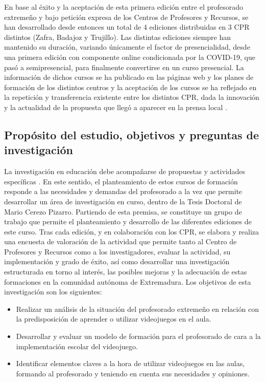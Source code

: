 \documentclass[spanish]{textolivre}
\begin{document}
En base al éxito y la aceptación de esta primera edición entre el profesorado extremeño y bajo petición expresa de los Centros de Profesores y Recursos, se han desarrollado desde entonces un total de 4 ediciones distribuidas en 3 CPR distintos (Zafra, Badajoz y Trujillo). Las distintas ediciones siempre han mantenido su duración, variando únicamente el factor de presencialidad, desde una primera edición con componente online condicionada por la COVID-19, que pasó a semipresencial, para finalmente convertirse en un curso presencial. La información de dichos cursos se ha publicado en las páginas web y los planes de formación de los distintos centros \cite{cprzafra2021videojuegos} y la aceptación de los cursos se ha reflejado en la repetición y transferencia existente entre los distintos CPR, dada la innovación y la actualidad de la propuesta que llegó a aparecer en la prensa local \cite{diariohoy2022curso}.


\subsection{Propósito del estudio, objetivos y preguntas de investigación}\label{sec-formato}
La investigación en educación debe acompañarse de propuestas y actividades específicas \cite{counsell2000usefulness,gonzalez2023diseno}. En este sentido, el planteamiento de estos cursos de formación responde a las necesidades y demandas del profesorado a la vez que permite desarrollar un área de investigación en curso, dentro de la Tesis Doctoral de Mario Cerezo Pizarro. Partiendo de esta premisa, se constituye un grupo de trabajo que permite el planteamiento y desarrollo de las diferentes ediciones de este curso. Tras cada edición, y en colaboración con los CPR, se elabora y realiza una encuesta de valoración de la actividad que permite tanto al Centro de Profesores y Recursos como a los investigadores, evaluar la actividad, su implementación y grado de éxito, así como desarrollar una investigación estructurada en torno al interés, las posibles mejoras y la adecuación de estas formaciones en la comunidad autónoma de Extremadura. Los objetivos de esta investigación son los siguientes:

\begin{itemize}
    \item Realizar un análisis de la situación del profesorado extremeño en relación con la predisposición de aprender o utilizar videojuegos en el aula.
    \item Desarrollar y evaluar un modelo de formación para el profesorado de cara a la implementación escolar del videojuego.
    \item Identificar elementos claves a la hora de utilizar videojuegos en las aulas, formando al profesorado y teniendo en cuenta sus necesidades y opiniones.
\end{itemize}
\end{document}
